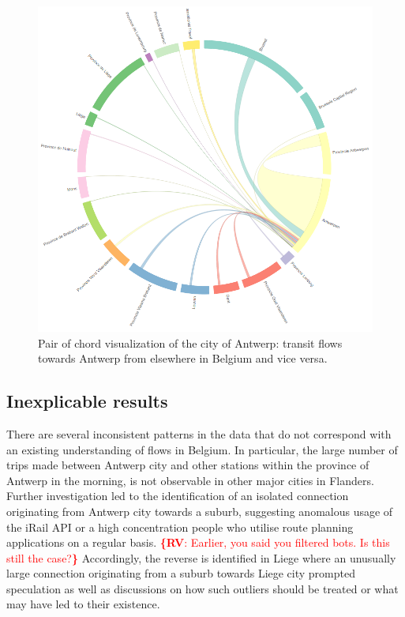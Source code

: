 \documentclass{sig-alternate}
\newcommand{\rv}[1]{\noindent\textcolor{red}{{\bf \{RV}: #1{\bf \}}}}
\begin{document}
\begin{figure}
\centering
\includegraphics[width=15cm]{antwerp}
\caption{Pair of chord visualization of the city of Antwerp: transit flows towards Antwerp from elsewhere in Belgium and vice versa.}
\label{fig:antwerp}
\end{figure}

\subsection{Inexplicable results}

There are several inconsistent patterns in the data that do not correspond with an existing understanding of flows in Belgium.
In particular, the large number of trips made between Antwerp city and other stations within the province of Antwerp in the morning, is not observable in other major cities in Flanders.
Further investigation led to the identification of an isolated connection originating from Antwerp city towards a suburb, suggesting anomalous usage of the iRail API or a high concentration people who utilise route planning applications on a regular basis.
\rv{Earlier, you said you filtered bots. Is this still the case?}
Accordingly, the reverse is identified in Liege where an unusually large connection originating from a suburb towards Liege city prompted speculation as well as discussions on how such outliers should be treated or what may have led to their existence.
\end{document}
